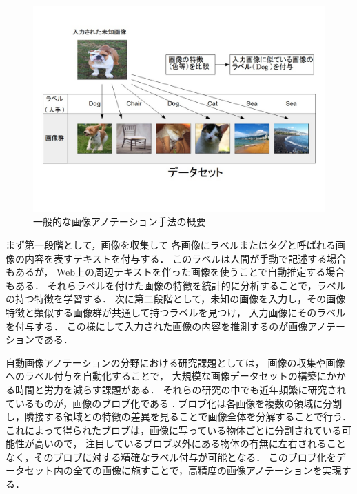 \documentclass{deimj}
\begin{document}
\begin{figure}[tb]
 \begin{center}
  \includegraphics[scale=0.50]{gaiyou.jpg}
 \end{center}
 \caption{一般的な画像アノテーション手法の概要}
 \label{fig:abst}
\end{figure}

まず第一段階として，画像を収集して
各画像にラベルまたはタグと呼ばれる画像の内容を表すテキストを付与する．
このラベルは人間が手動で記述する場合もあるが，
Web上の周辺テキストを伴った画像を使うことで自動推定する場合もある．
それらラベルを付けた画像の特徴を統計的に分析することで，ラベルの持つ特徴を学習する．
次に第二段階として，未知の画像を入力し，その画像特徴と類似する画像群が共通して持つラベルを見つけ，
入力画像にそのラベルを付与する．
この様にして入力された画像の内容を推測するのが画像アノテーションである．

自動画像アノテーションの分野における研究課題としては，
画像の収集や画像へのラベル付与を自動化することで，
大規模な画像データセットの構築にかかる時間と労力を減らす課題がある．
%
それらの研究の中でも近年頻繁に研究されているものが，画像のブロブ化である
\cite{duygulu,jeon}.
ブロブ化は各画像を複数の領域に分割し，隣接する領域との特徴の差異を見ることで画像全体を分解することで行う．
これによって得られたブロブは，画像に写っている物体ごとに分割されている可能性が高いので，
注目しているブロブ以外にある物体の有無に左右されることなく，そのブロブに対する精確なラベル付与が可能となる．
このブロブ化をデータセット内の全ての画像に施すことで，高精度の画像アノテーションを実現する．
\end{document}

